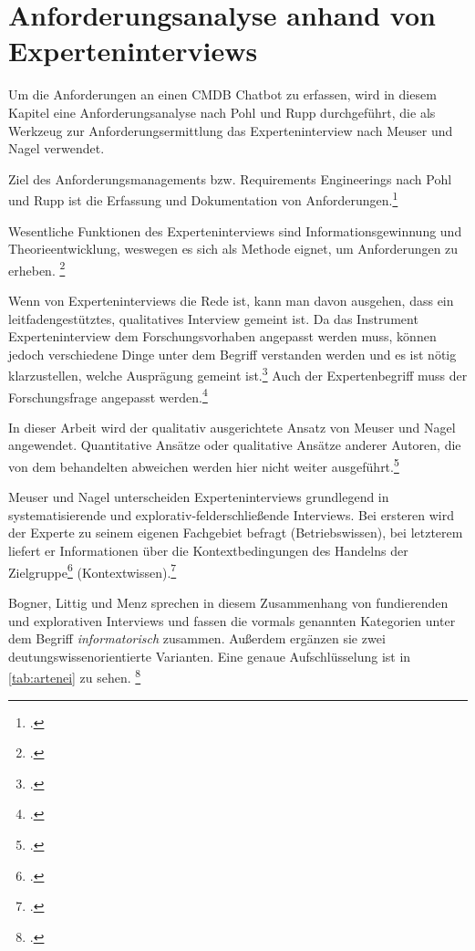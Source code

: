 \chapter{Anforderungsanalyse anhand von Experteninterviews} \label{AnfA}
Um die Anforderungen an einen \acs{CMDB} Chatbot zu erfassen, wird in diesem Kapitel eine Anforderungsanalyse nach Pohl und Rupp durchgeführt, die als Werkzeug zur Anforderungsermittlung das Experteninterview nach Meuser und Nagel verwendet.

Ziel des Anforderungsmanagements bzw. Requirements Engineerings nach Pohl und Rupp ist die Erfassung und Dokumentation von Anforderungen.\footcite[Vgl.][3]{Pohl_2015_Requirements}

Wesentliche Funktionen des Experteninterviews sind Informationsgewinnung und Theorieentwicklung, weswegen es sich als Methode eignet, um Anforderungen zu erheben.
\footcites[Vgl.][9]{Bogner_2014_Interview}[Vgl.][187\psq]{Glaeser_2010_Inhaltsanalyse}

Wenn von Experteninterviews die Rede ist, kann man davon ausgehen, dass ein leitfadengestütztes, qualitatives Interview gemeint ist. Da das Instrument Experteninterview dem Forschungsvorhaben angepasst werden muss, können jedoch verschiedene Dinge unter dem Begriff verstanden werden und es ist nötig klarzustellen, welche Ausprägung gemeint ist.\footcite[Vgl.][3]{Bogner_2014_Interview}
Auch der Expertenbegriff muss der Forschungsfrage angepasst werden.\footcite[Vgl.][180]{Meuser_1994_Interview}

In dieser Arbeit wird der qualitativ ausgerichtete Ansatz von Meuser und Nagel angewendet. Quantitative Ansätze oder qualitative Ansätze anderer Autoren, die von dem behandelten abweichen werden hier nicht weiter ausgeführt.\footcite[Vgl.][o. \pno]{Meuser_2010_Interview}

Meuser und Nagel unterscheiden Experteninterviews grundlegend in systematisierende und explorativ-felderschließende Interviews. Bei ersteren wird der Experte zu seinem eigenen Fachgebiet befragt (Betriebswissen), bei letzterem liefert er \glqq{}Informationen über die Kontextbedingungen des Handelns der Zielgruppe\grqq\footcite[][445]{Meuser_1991_Interview} (Kontextwissen).\footcite[Vgl.][445]{Meuser_1991_Interview}

Bogner, Littig und Menz sprechen in diesem Zusammenhang von fundierenden und explorativen Interviews und fassen die vormals genannten Kategorien unter dem Begriff \textit{informatorisch} zusammen. Außerdem ergänzen sie zwei  deutungswissenorientierte Varianten. Eine genaue Aufschlüsselung ist in \autoref{tab:artenei} zu sehen.
\footcites[Vgl.][22\psqq]{Bogner_2014_Interview}[Vgl.][445\psq]{Meuser_1991_Interview}


